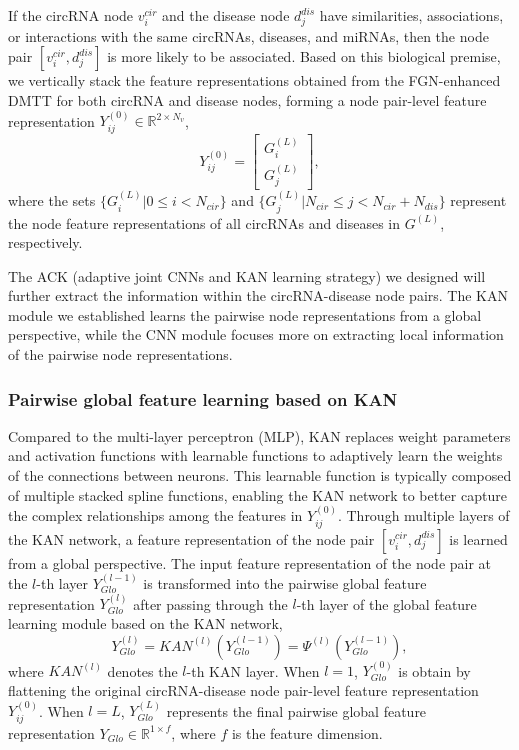 \documentclass[journal,twoside,web]{ieeecolor}
\begin{document}
If the circRNA node $v_i^{cir}$ and the disease node $d_j^{dis}$ have similarities, associations, or interactions with the same circRNAs, diseases, and miRNAs, then the node pair $[v_i^{cir}, d_j^{dis}]$ is more likely to be associated. Based on this biological premise, we vertically stack the feature representations obtained from the FGN-enhanced DMTT for both circRNA and disease nodes, forming a node pair-level feature representation ${Y_{ij}^{(0)}} \in \mathbb{R}^{2 \times N_v}$,
\begin{equation}
    {Y_{ij}^{(0)}} = \begin{bmatrix} {G^{(L)}_i} \\ {G^{(L)}_j} \end{bmatrix},
\end{equation}
where the sets $\{G^{(L)}_{i} | 0 \leqslant i < N_{cir}\}$ and $\{G^{(L)}_j | N_{cir} \leqslant j < N_{cir} + N_{dis}\}$ represent the node feature representations of all circRNAs and diseases in $G^{(L)}$, respectively.

The ACK (adaptive joint CNNs and KAN learning strategy) we designed will further extract the information within the circRNA-disease node pairs. The KAN module we established learns the pairwise node representations from a global perspective, while the CNN module focuses more on extracting local information of the pairwise node representations.

\subsubsection{Pairwise global feature learning based on KAN}
Compared to the multi-layer perceptron (MLP), KAN replaces weight parameters and activation functions with learnable functions to adaptively learn the weights of the connections between neurons. This learnable function is typically composed of multiple stacked spline functions, enabling the KAN network to better capture the complex relationships among the features in ${Y_{ij}^{(0)}}$. Through multiple layers of the KAN network, a feature representation of the node pair $[v_i^{cir}, d_j^{dis}]$ is learned from a global perspective. The input feature representation of the node pair at the $l$-th layer $Y_{Glo}^{(l - 1)}$ is transformed into the pairwise global feature representation ${Y}_{Glo}^{(l)}$ after passing through the $l$-th layer of the global feature learning module based on the KAN network,
\begin{equation}
    {Y}_{Glo}^{(l)} = KAN^{(l)}(Y_{Glo}^{(l - 1)}) = \varPsi^{(l)}(Y_{Glo}^{(l - 1)}),
\end{equation}
where $KAN^{(l)}$ denotes the $l$-th KAN layer. When $l=1$, $Y_{Glo}^{(0)}$ is obtain by flattening the original circRNA-disease node pair-level feature representation $Y_{ij}^{(0)}$. When $l=L$, $Y_{Glo}^{(L)}$ represents the final pairwise global feature representation ${Y}_{Glo} \in \mathbb{R}^{1\times f}$, where $f$ is the feature dimension. 
\end{document}
